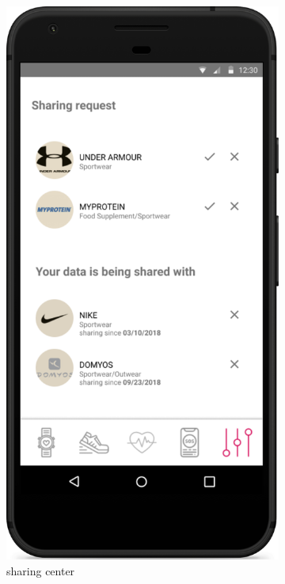 \documentclass[../main.tex]{subfiles}
\begin{document}
\begin{figure}[H]
\begin{subfigure}[b]{0.45\linewidth}
		\label{mock_settings}
	\end{subfigure}
	\begin{subfigure}[b]{0.45\linewidth}
		\includegraphics[width=\linewidth]{images/mockup/SharingCenter.png}
		\caption{sharing center}
		\label{mock_sharingCenter}
	\end{subfigure}
	\caption{}
\end{figure}
\end{document}
